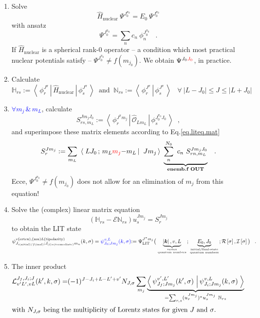 \documentclass[onecolumn,preprint,superscriptaddress,nofootinbib,notitlepage,10pt,linenumbers]{revtex4-1}
\newcommand{\black}[1]{\textcolor{black}{#1}}
\newcommand{\red}[1]{\textcolor{red}{#1}}
\newcommand{\blue}[1]{\textcolor{blue}{#1}}
\newcommand{\be}{\begin{equation}}
\newcommand{\ee}{\end{equation}}
\newcommand{\la}{\label}
\newcommand{\ve}[1]{\ensuremath{\boldsymbol{#1}}}
\newcommand{\bet}[1] {\left|#1\right|}
\newcommand{\overlap}[2] {\left\langle\,#1\,\left|\,#2\,\right.\right\rangle}
\newcommand{\me}[3] {\left\langle\,#1\,\left|\left.\,#2\,\right|\,#3\,\right.\right\rangle}
\newcommand{\clg}[6]{\ensuremath{\left\langle\left.\,#1#2\,;\,#3#4\,\right\vert\right.\left.\,#5#6\,\right\rangle}}
\newcommand{\re}[1] {\mathcal{R}\left[#1\right]}
\newcommand{\im}[1] {\mathcal{I}\left[#1\right]}
\newcommand{\E}{\mathcal{E}}
\begin{document}
\begin{enumerate}[label=(\roman*)]

\item Solve $$\hat{H}_\text{nuclear}~\Psi^{J_0^{\pi_0}}=E_0~\Psi^{J_0^{\pi_0}}$$ with ansatz
$$\Psi^{J_0^{\pi_0}}=\sum\limits_nc_n~\phi^{J_0^{\pi_0}}_n\;\;\;.$$
If $\hat{H}_\text{nuclear}$ is a spherical rank-0 operator -- a condition which most practical nuclear potentials satisfy --
$\Psi^{J_0^{\pi_0}}\neq f(m_{j_0})$. We obtain $\Psi^{J_0\red{J_0}}$, in practice.

\item Calculate
$$\mathbb{H}_{rs}:=\me{\phi^{J^\pi}_r}{\hat{H}_\text{nuclear}}{\phi^{J^\pi}_s}\;\;\text{and}\;\;\mathbb{N}_{rs}:=\overlap{\phi^{J^\pi}_r}{\phi^{J^\pi}_s}\;\;\;
\forall~|L-J_0|\leq J\leq|L+J_0|$$

\item \blue{$\forall m_j\,\&\,m_L$}, calculate
$$S^{Jm_jJ_0}_{rs,m_L}:=\me{\phi^{J^\pi m_j}_r}{\hat{\mathcal{O}}_{Lm_L}}{\phi^{J_0^{\pi_0}J_0}_s}\;\;,$$
and superimpose these matrix elements according to Eq.\eqref{eq.liteq.mat}
\be\la{eq.litinhomo}
S^{Jm_j}_r:=\sum\limits_{m_L}~\clg{L}{J_0}{m_L}{\red{m_j}\black{-m_L}}{J}{m_j}~\underbrace{\sum\limits_{n}^{N_0}~c_n~S^{Jm_jJ_0}_{rn,m_L}}
_{\text{\bf enemb.f OUT}}\;\;\;.
\ee
Ecce, $\Psi^{J_0^{\pi_0}}\neq f(m_{j_0})$ does not allow for an elimination of $m_j$ from this equation!

\item Solve the (complex) linear matrix equation
\be\la{eq.liteq2}
\left(\mathbb{H}_{rs}-\E \mathbb{N}_{rs}\right)u^{Jm_j}_s=S^{Jm_j}_r
\ee
to obtain the LIT state
\be\la{eq.litstate}
\psi^{v(\text{ertex}),(\text{mu})L(\text{tipolarity})}_{J_{i(\text{nitial})/f(\text{inal})};J_{(\text{i})n(\text{termediate})}m_n}(k,\sigma)
=\blue{\psi^{v,L}_{J_0;Jm_j}(k,\sigma)}\black{:=
\Psi_\text{LIT}^{J^\pi m_j}\big(\underbrace{\bet{\ve{k}},v,L}_{\text{vertex}\atop\text{quantum numbers}};\underbrace{E_0,J_0}_{\text{initial/final-state}\atop\text{quantum numbers}};\re{\sigma},\im{\sigma}\big)\;\;\;.}
\ee

\item The inner product
\begin{align}\la{eq.litME}
\mathcal{L}_{v'L',vL}^{J_f,J_i;J}(k',k,\sigma)=&(-1)^{J-J_i+L-L'+v'}N_{J,\sigma}\sum_{m_j}
\underbrace{\overlap{\psi^{v',L'}_{J_f;Jm_j}(k',\sigma)}{\psi^{v,L}_{J_i;Jm_j}(k,\sigma)}}_{=\sum_{r,s}(u^{Jm_j}_r)^*u^{Jm_j}_s~\mathbb{N}_{rs}}\\
\intertext{with $N_{J,\sigma}$ being the multiplicity of Lorentz states for given $J$ and $\sigma$.}
\end{align}

\end{enumerate}
\end{document}
